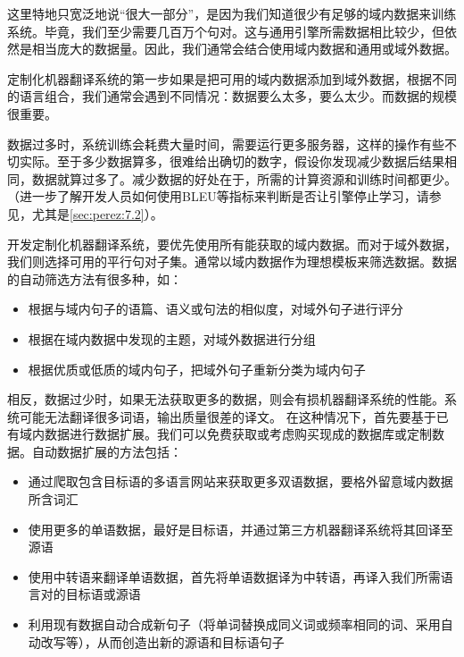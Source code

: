 \documentclass[output=paper]{langscibook}
\begin{document}
这里特地只宽泛地说“很大一部分”，是因为我们知道很少有足够的域内数据来训练系统。毕竟，我们至少需要几百万个句对。这与通用引擎所需数据相比较少，但依然是相当庞大的数据量。因此，我们通常会结合使用域内数据和通用或域外数据。

\begin{sloppypar}
定制化机器翻译系统的第一步如果是把可用的域内数据添加到域外数据，根据不同的语言组合，我们通常会遇到不同情况：数据要么太多，要么太少。而数据的规模很重要。
\end{sloppypar}


数据过多时，系统训练会耗费大量时间，需要运行更多服务器，这样的操作有些不切实际。至于多少数据算多，很难给出确切的数字，假设你发现减少数据后结果相同，数据就算过多了。减少数据的好处在于，所需的计算资源和训练时间都更少。（进一步了解开发人员如何使用BLEU等指标来判断是否让引擎停止学习，请参见，尤其是\ref{sec:perez:7.2}）。

开发定制化机器翻译系统，要优先使用所有能获取的域内数据。而对于域外数据，我们则选择可用的平行句对子集。通常以域内数据作为理想模板来筛选数据。数据的自动筛选方法有很多种，如：

\begin{itemize}
\item 根据与域内句子的语篇、语义或句法的相似度，对域外句子进行评分
\item 根据在域内数据中发现的主题，对域外数据进行分组
\item 根据优质或低质的域内句子，把域外句子重新分类为域内句子
\end{itemize}


相反，数据过少时，如果无法获取更多的数据，则会有损机器翻译系统的性能。系统可能无法翻译很多词语，输出质量很差的译文。 在这种情况下，首先要基于已有域内数据进行数据扩展。我们可以免费获取或考虑购买现成的数据库或定制数据。自动数据扩展的方法包括：

\begin{itemize}
\item 通过爬取包含目标语的多语言网站来获取更多双语数据，要格外留意域内数据所含词汇
\item 使用更多的单语数据，最好是目标语，并通过第三方机器翻译系统将其回译至源语
\item 使用中转语来翻译单语数据，首先将单语数据译为中转语，再译入我们所需语言对的目标语或源语
\item 利用现有数据自动合成新句子（将单词替换成同义词或频率相同的词、采用自动改写等），从而创造出新的源语和目标语句子
\end{itemize}
\end{document}
